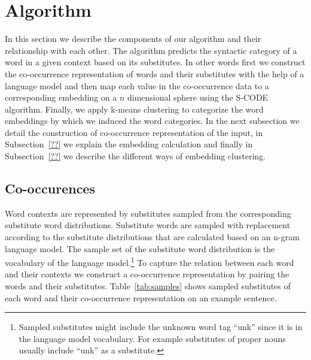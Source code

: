 \section{Algorithm}

In this section we describe the components of our algorithm and their
relationship with each other.  The algorithm predicts the syntactic
category of a word in a given context based on its substitutes.  In
other words first we construct the co-occurrence representation of
words and their substitutes with the help of a language model and then
map each value in the co-occurrence data to a corresponding embedding
on a $n$ dimensional sphere using the S-CODE algorithm.  Finally, we
apply k-means clustering to categorize the word embeddings by which we
induced the word categories.  In the next subsection we detail the
construction of co-occurrence representation of the input, in
Subsection~\ref{??} we explain the embedding calculation and finally
in Subsection~\ref{??} we describe the different ways of embedding
clustering.

\subsection{Co-occurences}


Word contexts are represented by substitutes sampled from the
corresponding substitute word distributions.  Substitute words are
sampled with replacement according to the substitute distributions
that are calculated based on an n-gram language model.  The sample set
of the substitute word distribution is the vocabulary of the language
model.\footnote{Sampled substitutes might include the unknown word tag
  ``unk'' since it is in the language model vocabulary.  For example
  substitutes of proper nouns usually include ``unk'' as a
  substitute.}  To capture the relation between each word and their
contexts we construct a co-occurrence representation by pairing the
words and their substitutes.  Table~\ref{tab:samples} shows sampled
substitutes of each word and their co-occurrence representation on an
example sentence.

